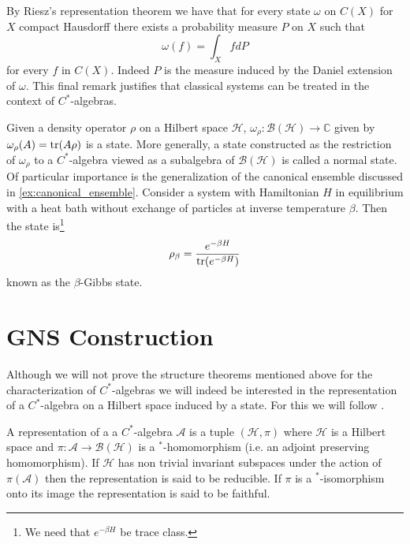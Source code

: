 \begin{example}
By Riesz's representation theorem \cite{Hewitt1975} we have that for every state $\omega$ on $C(X)$ for $X$ compact Hausdorff there exists a probability measure $P$ on $X$ such that
\begin{equation}
\omega (f)=\int_X fdP
\end{equation}    
for every $f$ in $C(X)$. Indeed $P$ is the measure induced by the Daniel extension of $\omega$. This final remark justifies that classical systems can be treated in the context of $C^*$-algebras. 
\end{example}

\begin{example}\label{ex:Gibbs}
Given a density operator $\rho$ on a Hilbert space $\mathcal{H}$, $\omega_\rho:\mathcal{B} (\mathcal{H})\rightarrow\mathbb{C}$ given by $\omega_\rho(A)=\operatorname{tr}(A\rho)$ is a state. More generally, a state constructed as the restriction of $\omega_\rho$ to a $C^*$-algebra viewed as a subalgebra of $\mathcal{B}(\mathcal{H})$ is called a normal state. Of particular importance is the generalization of the canonical ensemble discussed in \ref{ex:canonical_ensemble}. Consider a system with Hamiltonian $H$ in equilibrium with a heat bath without exchange of particles at inverse temperature $\beta$. Then the state is\footnote{We need that $e^{-\beta H}$ be trace class.}
\begin{equation}
\rho_\beta=\frac{e^{-\beta H}}{\operatorname{tr}(e^{-\beta H})}
\end{equation}
known as the $\beta$-Gibbs state\cite{Kubo1965}\cite{Duvenhage1999}. 
\end{example}

\section{GNS Construction}

Although we will not prove the structure theorems mentioned above for the characterization of $C^*$-algebras we will indeed be interested in the representation of a $C^*$-algebra on a Hilbert space induced by a state. For this we will follow \cite{Bratteli1997}.

\begin{definition}
A representation of a a $C^*$-algebra $\mathcal{A}$ is a tuple $(\mathcal{H},\pi)$ where $\mathcal{H}$ is a Hilbert space and $\pi:\mathcal{A}\rightarrow \mathcal{B}(\mathcal{H})$ is a $^*$-homomorphism (i.e. an adjoint preserving homomorphism). If $\mathcal{H}$ has non trivial invariant subspaces under the action of $\pi(\mathcal{A})$ then the representation is said to be reducible. If $\pi$ is a $^*$-isomorphism onto its image the representation is said to be faithful. 
\end{definition}

